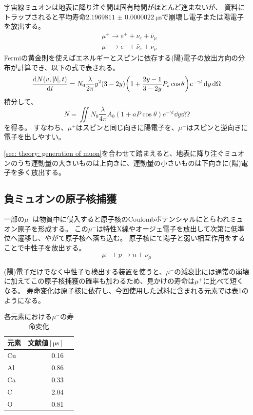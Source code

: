 \documentclass[dvipdfmx]{jsarticle}
\begin{document}
宇宙線ミュオンは地表に降り注ぐ間は固有時間がほとんど進まないが、
資料にトラップされると平均寿命$\SI{2.1969811(22)}{\micro\second}$で崩壊し電子または陽電子を放出する。
\begin{align*}
    &\mu^+\to e^++\nu_e+\bar{\nu}_\mu
    \\
    &\mu^-\to e^-+\bar{\nu}_e+\nu_\mu
\end{align*}
Fermiの黄金則を使えばエネルギーとスピンに依存する(陽)電子の放出方向の分布が計算でき、以下の式で表される。
\begin{equation*}
    \dv{N(v,|b|,t)}{t}
    =
    N_0\frac{\lambda}{2\pi}y^2(3-2y)
    \qty(
        1+\frac{2y-1}{3-2y}P_z\cos\theta
    )
    e^{-\gamma t}\dd{y}\dd{\Omega}
\end{equation*}
積分して、
\begin{equation*}
    N=
    \iint N_0\frac{\lambda}{4\pi}
    A_0(1+aP\cos\theta)e^{-\gamma t}
    \dd{y}\dd{\Omega}
\end{equation*}
を得る。
すなわち、$\mu^+$はスピンと同じ向きに陽電子を、$\mu^-$はスピンと逆向きに電子を出しやすい。

\ref{sec: theory: generation of muon}を合わせて踏まえると、地表に降り注ぐミュオンのうち運動量の大きいものは上向きに、運動量の小さいものは下向きに(陽)電子を多く放出する。


\subsection{負ミュオンの原子核捕獲}

一部の$\mu^-$は物質中に侵入すると原子核のCoulombポテンシャルにとらわれミュオン原子を形成する。
この$\mu^-$は特性X線やオージェ電子を放出して次第に低準位へ遷移し、やがて原子核へ落ち込む。
原子核にて陽子と弱い相互作用をすることで中性子を放出する。
\begin{equation*}
    \mu^-+p\to n+\nu_\mu
\end{equation*}

(陽)電子だけでなく中性子も検出する装置を使うと、$\mu^-$の減衰比には通常の崩壊に加えてこの原子核捕獲の確率も加わるため、見かけの寿命は$\mu^+$に比べて短くなる。
寿命変化は原子核に依存し、今回使用した試料に含まれる元素では表\ref{table: theory: life of muon}のようになる\cite{Ito Kaji Tabata Yoshiwara}。

\begin{table}
    \centering
    \caption{各元素における$\mu^-$の寿命変化}
    \begin{tabular}{lrr}
        \toprule
        元素 & 文献値$[\unit{\micro\second}]$
        \\
        \midrule
        Cu & 0.16
        \\
        Al & 0.86
        \\
        Ca & 0.33
        \\
        C & 2.04
        \\
        O & 0.81
        \\
        \bottomrule
    \end{tabular}
    \label{table: theory: life of muon}
\end{table}
\end{document}

